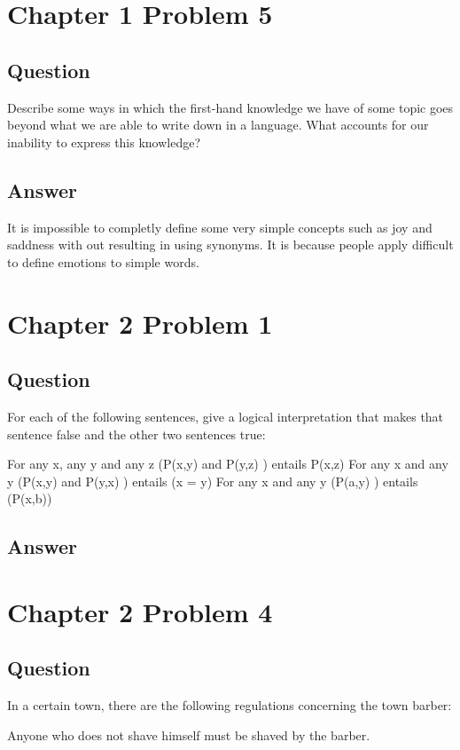 \documentclass[10pt]{article}         %
\begin{document}
\section{Chapter 1 Problem 5}
\subsection{Question}
Describe some ways in which the ﬁrst-hand knowledge we have of some
topic goes beyond what we are able to write down in a language.
What accounts for our inability to express this knowledge?

\subsection{Answer}
It is impossible to completly define some very simple concepts
such as joy and saddness with out resulting in using synonyms.
It is because people apply difficult to define emotions to simple words.


\section{Chapter 2 Problem 1}
\subsection{Question}
For each of the following sentences, give a logical interpretation that makes
that sentence false and the other two sentences true:

For any x, any y and any z (P(x,y) and P(y,z) ) entails P(x,z)
For any x and  any y  (P(x,y) and P(y,x) ) entails (x = y)
For any x and  any y  (P(a,y) ) entails (P(x,b))

\subsection{Answer}

\section{Chapter 2 Problem 4}
\subsection{Question}
In a certain town, there are the following regulations
concerning the town barber:

Anyone who does not shave himself must be shaved
by the barber.
\end{document}

